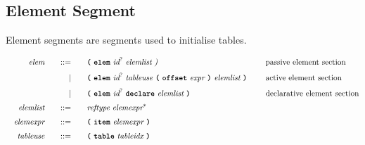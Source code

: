 \subsection{Element Segment}

Element segments are segments used to initialise tables.

\begin{alignat*}{9}
    && \textit{elem}    &&\quad ::= &\quad && \textbf{\texttt{(}}\ \textbf{\texttt{elem}}\ \textit{id}^?\ \textit{elemlist}\ \textit{)}\ \quad && \textrm{passive element section} \\[1mm]
    &&                  &&\quad  |  &\quad && \textbf{\texttt{(}}\ \textbf{\texttt{elem}}\ \textit{id}^?\ \textit{tableuse}\  \textbf{\texttt{(}}\ \textbf{\texttt{offset}}\ \textit{expr}\ \textbf{\texttt{)}}\ \textit{elemlist}\ \textbf{\texttt{)}}\  \quad && \textrm{active element section} \\[1mm]
    &&                  &&\quad  |  &\quad && \textbf{\texttt{(}}\ \textbf{\texttt{elem}}\ \textit{id}^?\ \textbf{\texttt{declare}}\ \textit{elemlist}\ \textbf{\texttt{)}}\  \quad && \textrm{declarative element section} \\[1mm]
    && \textit{elemlist}       &&\quad ::= &\quad && \textit{reftype}\ \textit{elemexpr}^*\ &&\\[1mm]
    && \textit{elemexpr}       &&\quad ::= &\quad && \textbf{\texttt{(}}\ \textbf{\texttt{item}}\ \textit{elemexpr}\ \textbf{\texttt{)}}\ &&\\[1mm]
    && \textit{tableuse}       &&\quad ::= &\quad && \textbf{\texttt{(}}\ \textbf{\texttt{table}}\ \textit{tableidx}\ \textbf{\texttt{)}}\ &&\\[1mm]
\end{alignat*}


